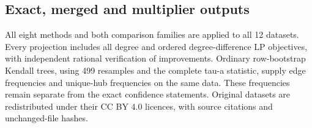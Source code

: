 \subsection{Exact, merged and multiplier outputs}
All eight methods and both comparison families are applied to all 12 datasets. Every projection includes all degree and ordered degree-difference LP objectives, with independent rational verification of improvements. Ordinary row-bootstrap Kendall trees, using 499 resamples and the complete tau-a statistic, supply edge frequencies and unique-hub frequencies on the same data. These frequencies remain separate from the exact confidence statements. Original datasets are redistributed under their CC BY 4.0 licences, with source citations and unchanged-file hashes.





